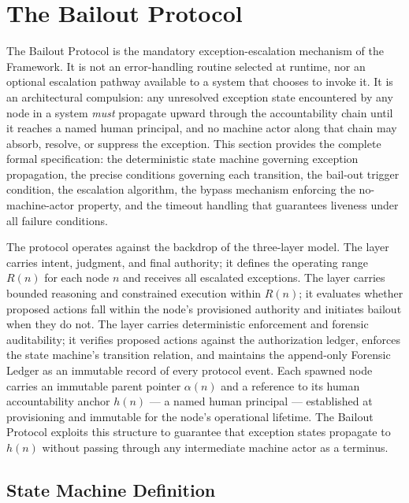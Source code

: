 \section{The Bailout Protocol}\label{sec:bailout}

The Bailout Protocol is the mandatory exception-escalation mechanism of the \bxthree{} Framework. It is not an error-handling routine selected at runtime, nor an optional escalation pathway available to a system that chooses to invoke it. It is an architectural compulsion: any unresolved exception state encountered by any node in a \bxthree{} system \emph{must} propagate upward through the accountability chain until it reaches a named human principal, and no machine actor along that chain may absorb, resolve, or suppress the exception. This section provides the complete formal specification: the deterministic state machine governing exception propagation, the precise conditions governing each transition, the bail-out trigger condition, the escalation algorithm, the bypass mechanism enforcing the no-machine-actor property, and the timeout handling that guarantees liveness under all failure conditions.

The protocol operates against the backdrop of the \bxthree{} three-layer model. The \purpose{} layer carries intent, judgment, and final authority; it defines the operating range $R(n)$ for each node $n$ and receives all escalated exceptions. The \bounds{} layer carries bounded reasoning and constrained execution within $R(n)$; it evaluates whether proposed actions fall within the node's provisioned authority and initiates bailout when they do not. The \fact{} layer carries deterministic enforcement and forensic auditability; it verifies proposed actions against the authorization ledger, enforces the state machine's transition relation, and maintains the append-only Forensic Ledger as an immutable record of every protocol event. Each spawned node carries an immutable parent pointer $\alpha(n)$ and a reference to its human accountability anchor $h(n)$ — a named human principal — established at provisioning and immutable for the node's operational lifetime. The Bailout Protocol exploits this structure to guarantee that exception states propagate to $h(n)$ without passing through any intermediate machine actor as a terminus.

\subsection{State Machine Definition}\label{sec:state-machine}

